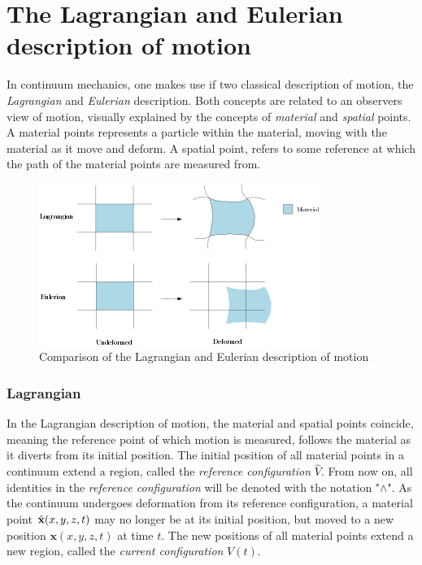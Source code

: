 \section{The Lagrangian and Eulerian description of motion}
In continuum mechanics, one makes use if two classical description of motion, the \textit{Lagrangian} and \textit{Eulerian} description. Both concepts are related to an observers view of motion, visually explained by the concepts of \textit{material} and \textit{spatial} points. A material points represents a particle within the material, moving with the material as it move and deform. A spatial point, refers to some reference at which the path of the material points are measured from. 

\begin{figure}[h!]
  \centering
    \includegraphics[scale=0.9]{./Fig/lageul.png}
      \caption{Comparison of the Lagrangian and Eulerian description of motion}
\end{figure}


\subsubsection*{Lagrangian}
In the Lagrangian description of motion, the material and spatial points coincide, meaning the reference point of which motion is measured, follows the material as it diverts from its initial position. The initial position of all material points in a continuum extend a region, called the \textit{reference configuration} $\hat{V}$. From now on, all identities in the \textit{reference configuration} will be denoted with the notation "$\wedge$". As the continuum undergoes deformation from its reference configuration, a material point $\hat{\mathbf{x}}(x, y, z ,t)$ may no longer be at its initial position, but moved to a new position $\mathbf{x}(x, y, z, t)$ at time $t$.  The new positions of all material points extend a new region, called the \textit{current configuration} $V(t)$. 



